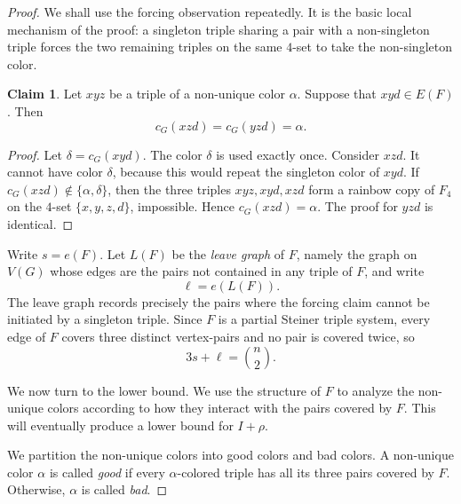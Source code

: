 \documentclass[10pt,a4paper]{article}
\theoremstyle{definition}
\newtheorem{claim}[theorem]{Claim}
\begin{document}
\begin{proof}
    We shall use the forcing observation repeatedly.
    It is the basic local mechanism of the proof: a singleton triple sharing a pair with a non-singleton triple forces the two remaining triples on the same $4$-set to take the non-singleton color.

    \begin{claim}\label{clm:forcing-new}
        Let $xyz$ be a triple of a non-unique color $\alpha$.  Suppose that
        $xyd\in E(F)$.  Then
        \[
            c_G(xzd)=c_G(yzd)=\alpha.
        \]
    \end{claim}

    \begin{proof}
        Let $\delta=c_G(xyd)$.  The color $\delta$ is used exactly once.
        Consider $xzd$.  It cannot have color $\delta$, because this would
        repeat the singleton color of $xyd$.  If $c_G(xzd)\notin
            \{\alpha,\delta\}$, then the three triples $xyz,xyd,xzd$ form a rainbow copy of $F_4$ on the $4$-set $\{x,y,z,d\}$, impossible.
        Hence $c_G(xzd)=\alpha$.  The proof for $yzd$ is identical.
    \end{proof}

    Write $s=e(F)$.
    Let $L(F)$ be the {\it leave graph} of $F$, namely the graph on $V(G)$ whose
    edges are the pairs not contained in any triple of $F$, and write
    \[
        \ell=e(L(F)).
    \]
    The leave graph records precisely the pairs where the forcing claim cannot be initiated by a singleton triple.
    Since $F$ is a partial Steiner triple system, every edge of $F$ covers three distinct vertex-pairs and no pair is covered twice, so
    \begin{equation}\label{eq:leave-upper-new}
        3s+\ell=\binom{n}{2}.
    \end{equation}

    We now turn to the lower bound. We use the structure of $F$ to analyze the non-unique colors according to how they interact with the pairs covered by \(F\).  This will eventually produce a lower bound for \(I+\rho\).

    We partition the non-unique colors into good colors and bad colors.
    A non-unique color $\alpha$ is called {\it good} if every $\alpha$-colored triple
    has all its three pairs covered by $F$.  Otherwise, $\alpha$ is called {\it bad}.


\end{proof}
\end{document}
